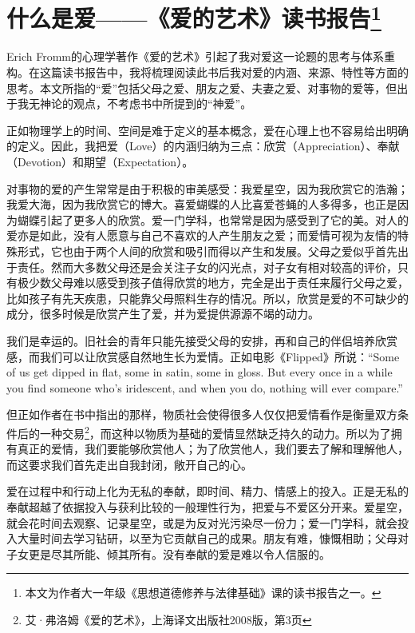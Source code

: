\section*{什么是爱——《爱的艺术》读书报告\footnote{本文为作者大一年级《思想道德修养与法律基础》课的读书报告之一。}}

\par Erich Fromm的心理学著作《爱的艺术》引起了我对爱这一论题的思考与体系重构。在这篇读书报告中，我将梳理阅读此书后我对爱的内涵、来源、特性等方面的思考。本文所指的“爱”包括父母之爱、朋友之爱、夫妻之爱、对事物的爱等，但出于我无神论的观点，不考虑书中所提到的“神爱”。
\par 正如物理学上的时间、空间是难于定义的基本概念，爱在心理上也不容易给出明确的定义。因此，我把爱（Love）的内涵归纳为三点：欣赏（Appreciation）、奉献（Devotion）和期望（Expectation）。
\par 对事物的爱的产生常常是由于积极的审美感受：我爱星空，因为我欣赏它的浩瀚；我爱大海，因为我欣赏它的博大。喜爱蝴蝶的人比喜爱苍蝇的人多得多，也正是因为蝴蝶引起了更多人的欣赏。爱一门学科，也常常是因为感受到了它的美。对人的爱亦是如此，没有人愿意与自己不喜欢的人产生朋友之爱；而爱情可视为友情的特殊形式，它也由于两个人间的欣赏和吸引而得以产生和发展。父母之爱似乎首先出于责任。然而大多数父母还是会关注子女的闪光点，对子女有相对较高的评价，只有极少数父母难以感受到孩子值得欣赏的地方，完全是出于责任来履行父母之爱，比如孩子有先天疾患，只能靠父母照料生存的情况。所以，欣赏是爱的不可缺少的成分，很多时候是欣赏产生了爱，并为爱提供源源不竭的动力。
\par 我们是幸运的。旧社会的青年只能先接受父母的安排，再和自己的伴侣培养欣赏感，而我们可以让欣赏感自然地生长为爱情。正如电影《Flipped》所说：“Some of us get dipped in flat, some in satin, some in gloss. But every once in a while you find someone who's iridescent, and when you do, nothing will ever compare.”
\par 但正如作者在书中指出的那样，物质社会使得很多人仅仅把爱情看作是衡量双方条件后的一种交易\footnote{艾·弗洛姆《爱的艺术》，上海译文出版社2008版，第3页}，而这种以物质为基础的爱情显然缺乏持久的动力。所以为了拥有真正的爱情，我们要能够欣赏他人；为了欣赏他人，我们要去了解和理解他人，而这要求我们首先走出自我封闭，敞开自己的心。
\par 爱在过程中和行动上化为无私的奉献，即时间、精力、情感上的投入。正是无私的奉献超越了依据投入与获利比较的一般理性行为，把爱与不爱区分开来。爱星空，就会花时间去观察、记录星空，或是为反对光污染尽一份力；爱一门学科，就会投入大量时间去学习钻研，以至为它贡献自己的成果。朋友有难，慷慨相助；父母对子女更是尽其所能、倾其所有。没有奉献的爱是难以令人信服的。
